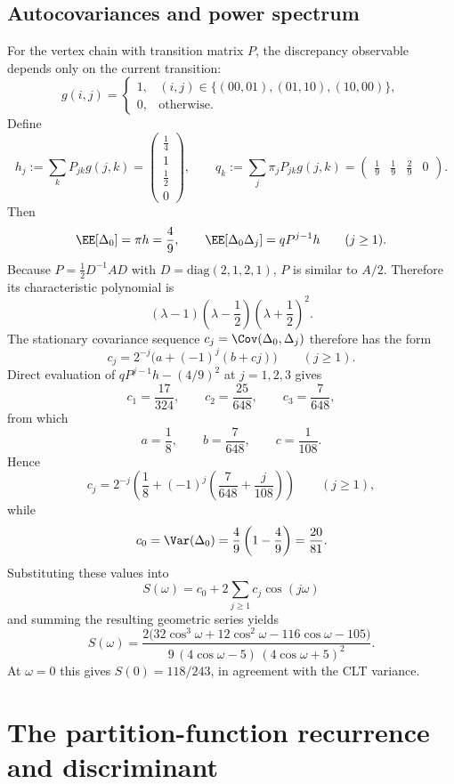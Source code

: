 \subsection{Autocovariances and power spectrum}
For the vertex chain with transition matrix \(P\), the discrepancy observable depends only on the current transition:
\[
g(i,j)=
\begin{cases}
1,& (i,j)\in\{(00,01),(01,10),(10,00)\},\\
0,& \text{otherwise}.
\end{cases}
\]
Define
\[
h_j:=\sum_k P_{jk}g(j,k)
=
\begin{pmatrix}
\frac14\\[2mm]
1\\[2mm]
\frac12\\[2mm]
0
\end{pmatrix},
\qquad
q_k:=\sum_j \pi_jP_{jk}g(j,k)
=
\begin{pmatrix}
\frac19 & \frac19 & \frac29 & 0
\end{pmatrix}.
\]
Then
\[
\EE[\Delta_0]=\pi h=\frac49,
\qquad
\EE[\Delta_0\Delta_j]=qP^{j-1}h\qquad (j\ge1).
\]
Because \(P=\tfrac12 D^{-1}AD\) with \(D=\mathrm{diag}(2,1,2,1)\), \(P\) is similar to \(A/2\). Therefore its characteristic polynomial is
\[
(\lambda-1)\left(\lambda-\frac12\right)\left(\lambda+\frac12\right)^2.
\]
The stationary covariance sequence \(c_j=\Cov(\Delta_0,\Delta_j)\) therefore has the form
\[
c_j=2^{-j}\bigl(a+(-1)^j(b+cj)\bigr)\qquad (j\ge1).
\]
Direct evaluation of \(qP^{j-1}h-(4/9)^2\) at \(j=1,2,3\) gives
\[
c_1=\frac{17}{324},\qquad
c_2=\frac{25}{648},\qquad
c_3=\frac{7}{648},
\]
from which
\[
a=\frac18,\qquad
b=\frac{7}{648},\qquad
c=\frac{1}{108}.
\]
Hence
\[
c_j = 2^{-j}\!\left(\frac{1}{8}+(-1)^j\!\left(\frac{7}{648}+\frac{j}{108}\right)\right)\qquad (j\ge1),
\]
while
\[
c_0=\Var(\Delta_0)=\frac49\left(1-\frac49\right)=\frac{20}{81}.
\]
Substituting these values into
\[
S(\omega)=c_0+2\sum_{j\ge1}c_j\cos(j\omega)
\]
and summing the resulting geometric series yields
\[
S(\omega)
=
\frac{2\bigl(32\cos^3\omega+12\cos^2\omega-116\cos\omega-105\bigr)}
{9\,(4\cos\omega-5)\,(4\cos\omega+5)^2}.
\]
At \(\omega=0\) this gives \(S(0)=118/243\), in agreement with the CLT variance.


\section{The partition-function recurrence and discriminant}
\label{app:recurrence}

